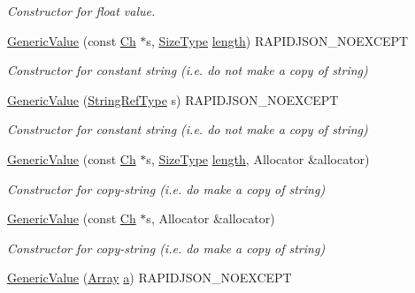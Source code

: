 \begin{DoxyCompactItemize}
\begin{DoxyCompactList}\small\item\em Constructor for float value. \end{DoxyCompactList}\item 
\hyperlink{classGenericValue_a4d9af98141360cd801daab4ed1ca2c91}{Generic\+Value} (const \hyperlink{classGenericValue_ade0e0ce64ccd5d852da57a35e720bafb}{Ch} $\ast$s, \hyperlink{rapidjson_8h_a5ed6e6e67250fadbd041127e6386dcb5}{Size\+Type} \hyperlink{imgui__impl__opengl3__loader_8h_a011fc24f10426c01349e94a4edd4b0d5}{length}) R\+A\+P\+I\+D\+J\+S\+O\+N\+\_\+\+N\+O\+E\+X\+C\+E\+PT
\begin{DoxyCompactList}\small\item\em Constructor for constant string (i.\+e. do not make a copy of string) \end{DoxyCompactList}\item 
\hyperlink{classGenericValue_abb2887958974fef1b2b5c8e32cc72ddb}{Generic\+Value} (\hyperlink{classGenericValue_a32e0f30ee278072374c8168b14d3317f}{String\+Ref\+Type} s) R\+A\+P\+I\+D\+J\+S\+O\+N\+\_\+\+N\+O\+E\+X\+C\+E\+PT
\begin{DoxyCompactList}\small\item\em Constructor for constant string (i.\+e. do not make a copy of string) \end{DoxyCompactList}\item 
\hyperlink{classGenericValue_a9ec2c7cda8c8845acfa3565c6b1b4e10}{Generic\+Value} (const \hyperlink{classGenericValue_ade0e0ce64ccd5d852da57a35e720bafb}{Ch} $\ast$s, \hyperlink{rapidjson_8h_a5ed6e6e67250fadbd041127e6386dcb5}{Size\+Type} \hyperlink{imgui__impl__opengl3__loader_8h_a011fc24f10426c01349e94a4edd4b0d5}{length}, Allocator \&allocator)
\begin{DoxyCompactList}\small\item\em Constructor for copy-\/string (i.\+e. do make a copy of string) \end{DoxyCompactList}\item 
\hyperlink{classGenericValue_a9b72b2e3347d4cd77b16c3b45e8decf1}{Generic\+Value} (const \hyperlink{classGenericValue_ade0e0ce64ccd5d852da57a35e720bafb}{Ch} $\ast$s, Allocator \&allocator)
\begin{DoxyCompactList}\small\item\em Constructor for copy-\/string (i.\+e. do make a copy of string) \end{DoxyCompactList}\item 
\hyperlink{classGenericValue_a953052ef91e54aabe9bdb9f9eaebf6cc}{Generic\+Value} (\hyperlink{classGenericValue_a149e12992b8f6064c865a4cf55981b89}{Array} \hyperlink{pointer_8h_aeeddce917cf130d62c370b8f216026dd}{a}) R\+A\+P\+I\+D\+J\+S\+O\+N\+\_\+\+N\+O\+E\+X\+C\+E\+PT

\end{DoxyCompactItemize}
